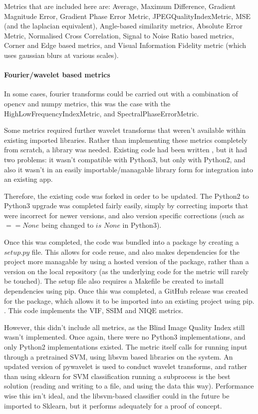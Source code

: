 \documentclass[10pt,a4paper]{article}
\begin{document}
        Metrics that are included here are: Average, Maximum Difference, Gradient Magnitude Error, Gradient Phase Error Metric, JPEGQualityIndexMetric, MSE (and the laplacian equivalent), Angle-based similarity metrics,
        Absolute Error Metric, Normalised Cross Correlation, Signal to Noise Ratio based metrics, Corner and Edge based metrics, and Visual Information Fidelity metric (which uses gaussian blurs at various scales).

        \paragraph{Fourier/wavelet based metrics}
        In some cases, fourier transforms could be carried out with a combination of opencv and numpy metrics, this was the case with the HighLowFrequencyIndexMetric,
        and SpectralPhaseErrorMetric.

        Some metrics required further wavelet transforms that weren't available within existing imported libraries. Rather than implementing these metrics completely
        from scratch, a library was needed. Existing code had been written \cite{VideoQualityOriginal}, but it had two problems: it wasn't compatible with Python3, but only
        with Python2, and also it wasn't in an easily importable/managable library form for integration into an existing app.

        Therefore, the existing code was forked in order to be updated. The Python2 to Python3 upgrade was completed fairly easily, simply by correcting imports that were incorrect
        for newer versions, and also version specific corrections (such as $== None$ being changed to $is$ $None$ in Python3).
        
        Once this was completed, the code was bundled into a package by creating a $setup.py$ file. This allows for code reuse, and also makes dependencies for the project
        more managable by using a hosted version of the package, rather than a version on the local repository (as the underlying code for the metric will rarely be touched).
        The setup file also requires a Makefile be created to install dependencies using pip. Once this was completed, a GitHub release was created for the package, which allows it to be
        imported into an existing project using pip. \cite{VideoQualityUpdated}. This code implements the VIF, SSIM and NIQE metrics.

        However, this didn't include all metrics, as the Blind Image Quality Index still wasn't implemented. Once again, there were no Python3 implementations, and only Python2 implementations existed.
        The metric itself calls for running input through a pretrained SVM, using libsvm based libraries on the system. An updated version of pywavelet is used to conduct wavelet transforms, and rather than using sklearn for SVM classification
        running a subprocess is the best solution (reading and writing to a file, and using the data this way). Performance wise this isn't ideal, and the libsvm-based classifier could in the future be
        imported to Sklearn, but it performs adequately for a proof of concept.
\end{document}
